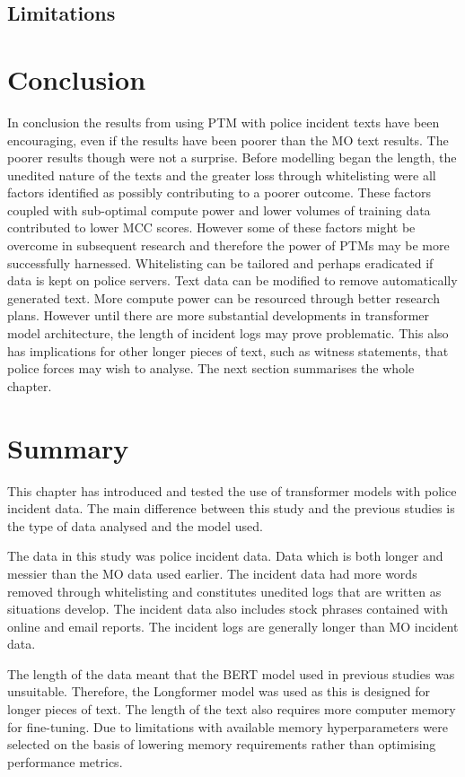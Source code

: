 \subsection{Limitations}

\section{Conclusion} In conclusion the results from using PTM with police incident texts have been encouraging, even if the results have been poorer than the MO text results. The poorer results though were not a surprise. Before modelling began the length, the unedited nature of the texts and the greater loss through whitelisting were all factors identified as possibly contributing to a poorer outcome. These factors coupled with sub-optimal compute power and lower volumes of training data contributed to lower MCC scores. However some of these factors might be overcome in subsequent research and therefore the power of PTMs may be more successfully harnessed. Whitelisting can be tailored and perhaps eradicated if data is kept on police servers. Text data can be modified to remove automatically generated text. More compute power can be resourced through better research plans. However until there are more substantial developments in transformer model architecture, the length of incident logs may prove problematic. This also has implications for other longer pieces of text, such as witness statements, that police forces may wish to analyse. The next section summarises the whole chapter.

\section{Summary} This chapter has introduced and tested the use of transformer models with police incident data. The main difference between this study and the previous studies is the type of data analysed and the model used. 

The data in this study was police incident data. Data which is both longer and messier than the MO data used earlier. The incident data had more words removed through whitelisting and constitutes unedited logs that are written as situations develop. The incident data also includes stock phrases contained with online and email reports. The incident logs are generally longer than MO incident data.

The length of the data meant that the BERT model used in previous studies was unsuitable. Therefore, the Longformer model was used as this is designed for longer pieces of text. The length of the text also requires more computer memory for fine-tuning. Due to limitations with  available memory hyperparameters were selected on the basis of lowering memory requirements rather than optimising performance metrics.

